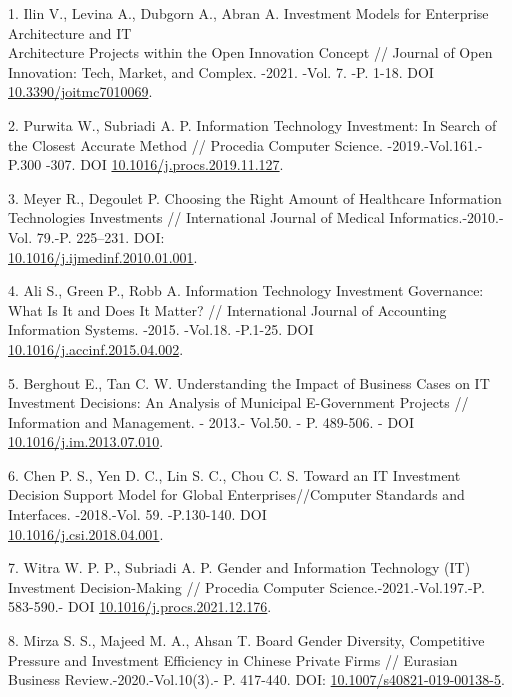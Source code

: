 \begin{references}
1. Ilin V., Levina A., Dubgorn A., Abran A. Investment Models for
Enterprise Architecture and IT \\Architecture Projects within the Open
Innovation Concept // Journal of Open Innovation: Tech, Market, and
Complex. -2021. -Vol. 7. -P. 1-18. DOI
\href{https://doi.org/10.3390/joitmc7010069}{10.3390/joitmc7010069}.

2. Purwita W., Subriadi A. P. Information Technology Investment: In
Search of the Closest Accurate Method // Procedia Computer Science.
-2019.-Vol.161.-P.300 -307.
DOI \href{https://doi.org/10.1016/j.procs.2019.11.127}{10.1016/j.procs.2019.11.127}.

3. Meyer R., Degoulet P. Choosing the Right Amount of Healthcare
Information Technologies Investments // International Journal of Medical
Informatics.-2010.- Vol. 79.-P. 225--231. DOI:\\
\href{https://doi.org/10.1016/j.ijmedinf.2010.01.001}{10.1016/j.ijmedinf.2010.01.001}.

4. Ali S., Green P., Robb A. Information Technology Investment
Governance: What Is It and Does It Matter? // International Journal of
Accounting Information Systems. -2015. -Vol.18. -P.1-25. DOI\\
\href{https://doi.org/10.1016/j.accinf.2015.04.002}{10.1016/j.accinf.2015.04.002}.

5. Berghout E., Tan C. W. Understanding the Impact of Business Cases on
IT Investment Decisions: An Analysis of Municipal E-Government Projects
// Information and Management. - 2013.- Vol.50. - P. 489-506. - DOI
\href{https://doi.org/10.1016/j.im.2013.07.010}{10.1016/j.im.2013.07.010}.

6. Chen P. S., Yen D. C., Lin S. C., Chou C. S. Toward an IT Investment
Decision Support Model for Global Enterprises//Computer Standards and
Interfaces. -2018.-Vol. 59. -P.130-140.
DOI \\\href{http://dx.doi.org/10.1016/j.csi.2018.04.001}{10.1016/j.csi.2018.04.001}.

7. Witra W. P. P., Subriadi A. P. Gender and Information Technology (IT)
Investment Decision-Making // Procedia Computer Science.-2021.-Vol.197.-P.
583-590.-
DOI \href{https://doi.org/10.1016/j.procs.2021.12.176}{10.1016/j.procs.2021.12.176}.

8. Mirza S. S., Majeed M. A., Ahsan T. Board Gender Diversity,
Competitive Pressure and Investment Efficiency in Chinese Private Firms
// Eurasian Business Review.-2020.-Vol.10(3).- P. 417-440. DOI:
\href{https://doi.org/10.1007/s40821-019-00138-5}{10.1007/s40821-019-00138-5}.


\end{references}
